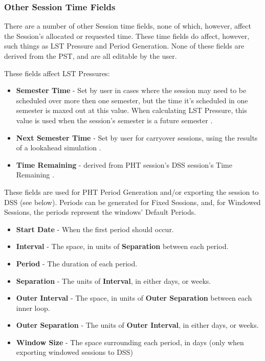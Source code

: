 \documentclass{article}
\begin{document}
\subsubsection{Other Session Time Fields}

There are a number of other Session time fields, none of which, however, affect the Session's allocated or requested time.  These time fields do affect, however, such things as LST Pressure and Period Generation.  None of these fields are derived from the PST, and are all editable by the user.

These fields affect LST Pressures:

\begin{itemize}
\item {\bf Semester Time } - Set by user in cases where the session may need to be scheduled over more then one semester, but the time it's scheduled in one semester is maxed out at this value.  When calculating LST Pressure, this value is used when the session's semester is a future semester \cite{marganian12a}.
\item {\bf Next Semester Time } - Set by user for carryover sessions, using the results of a lookahead simulation \cite{marganian12a}.
\item {\bf Time Remaining } - derived from PHT session's DSS session's Time Remaining \cite{marganian10a}.
\end{itemize}

These fields are used for PHT Period Generation and/or exporting the session to DSS (see below).  Periods can be generated for Fixed Sessions, and, for Windowed Sessions, the periods represent the windows' Default Periods.

\begin{itemize}
\item {\bf Start Date } - When the first period should occur.
\item {\bf Interval  } - The space, in units of {\bf Separation} between each period.
\item {\bf Period  } - The duration of each period.  
\item {\bf Separation } - The units of {\bf Interval}, in either days, or weeks.
\item {\bf Outer Interval } - The space, in units of {\bf Outer Separation} between each inner loop. 
\item {\bf Outer Separation } - The units of {\bf Outer Interval}, in either days, or weeks.
\item {\bf Window Size } - The space surrounding each period, in days (only when exporting windowed sessions to DSS) 
\end{itemize}
\end{document}
